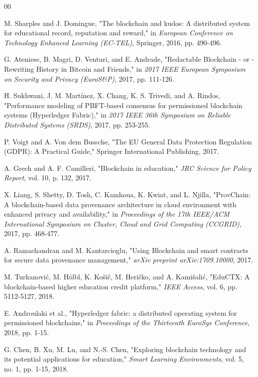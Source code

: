 \documentclass[conference]{IEEEtran}
\begin{document}
\begin{thebibliography}{00}

M. Sharples and J. Domingue, 
"The blockchain and kudos: A distributed system for educational record, reputation and reward," 
in \textit{European Conference on Technology Enhanced Learning (EC-TEL)}, Springer, 2016, pp. 490-496.

G. Ateniese, B. Magri, D. Venturi, and E. Andrade, 
"Redactable Blockchain - or - Rewriting History in Bitcoin and Friends," 
in \textit{2017 IEEE European Symposium on Security and Privacy (EuroS\&P)}, 2017, pp. 111-126.

H. Sukhwani, J. M. Martínez, X. Chang, K. S. Trivedi, and A. Rindos, 
"Performance modeling of PBFT-based consensus for permissioned blockchain systems (Hyperledger Fabric)," 
in \textit{2017 IEEE 36th Symposium on Reliable Distributed Systems (SRDS)}, 2017, pp. 253-255.

P. Voigt and A. Von dem Bussche, 
"The EU General Data Protection Regulation (GDPR): A Practical Guide," 
Springer International Publishing, 2017.

A. Grech and A. F. Camilleri, 
"Blockchain in education," 
\textit{JRC Science for Policy Report}, vol. 10, p. 132, 2017.

X. Liang, S. Shetty, D. Tosh, C. Kamhoua, K. Kwiat, and L. Njilla, 
"ProvChain: A blockchain-based data provenance architecture in cloud environment with enhanced privacy and availability," 
in \textit{Proceedings of the 17th IEEE/ACM International Symposium on Cluster, Cloud and Grid Computing (CCGRID)}, 2017, pp. 468-477.

A. Ramachandran and M. Kantarcioglu, 
"Using Blockchain and smart contracts for secure data provenance management," 
\textit{arXiv preprint arXiv:1709.10000}, 2017.


M. Turkanović, M. Hölbl, K. Košič, M. Heričko, and A. Kamišalić, 
"EduCTX: A blockchain-based higher education credit platform," 
\textit{IEEE Access}, vol. 6, pp. 5112-5127, 2018.

E. Androulaki et al., 
"Hyperledger fabric: a distributed operating system for permissioned blockchains," 
in \textit{Proceedings of the Thirteenth EuroSys Conference}, 2018, pp. 1-15.

G. Chen, B. Xu, M. Lu, and N.-S. Chen, 
"Exploring blockchain technology and its potential applications for education," 
\textit{Smart Learning Environments}, vol. 5, no. 1, pp. 1-15, 2018.


\end{thebibliography}
\end{document}
